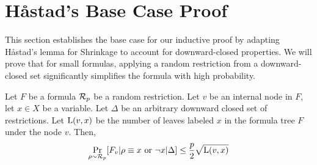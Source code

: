 \section{Håstad's Base Case Proof}
\label{sec: Hastad's base case proof}

This section establishes the base case for our inductive proof by adapting Håstad's lemma for Shrinkage to account for downward-closed properties. 
We will prove that for small formulas, applying a random restriction from a downward-closed set significantly simplifies the formula with high probability. 


\begin{lemma}
\label{lem: Base_case}
    Let $F$ be a \demorgan formula $\mathbf{\mathcal{R}}_p$ be a random restriction. Let $v$ be an internal node in $F$, let $x \in X$ be a variable. Let $\Delta$ be an arbitrary downward closed set of restrictions. Let $\mathrm{L}(v,x)$ be the number of leaves labeled $x$ in the formula tree $F$ under the node $v$. Then, 
    $$\Pr_{\rho \sim \mathbf{\mathcal{R}}_p}[F_v|\rho \equiv x \text{\ or\ } \neg x|\Delta] \le \frac{p}2\sqrt{\mathrm{L}(v,x)}$$
\end{lemma}

